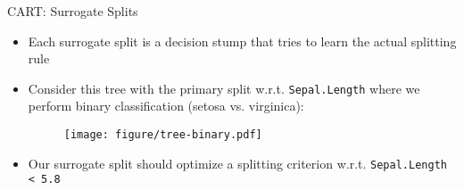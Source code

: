 \documentclass[11pt,compress,t,notes=noshow, xcolor=table]{beamer}
\begin{document}
\begin{vbframe}{CART: Surrogate Splits}
\begin{itemize}
\item Each surrogate split is a decision stump that tries to learn the actual splitting rule
\item Consider this tree with the primary split w.r.t. \texttt{Sepal.Length} where we perform binary classification (setosa vs. virginica):
\begin{figure}
\texttt{[image: figure/tree-binary.pdf]} 
\end{figure}
\item Our surrogate split should optimize a splitting criterion w.r.t. \texttt{Sepal.Length < 5.8}
\end{itemize}



\end{vbframe}
\end{document}
